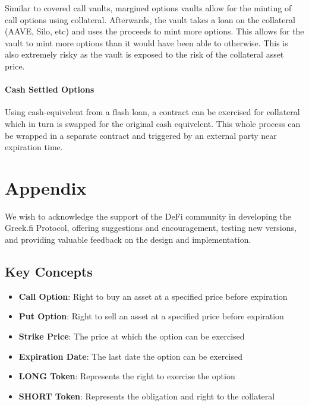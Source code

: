 \documentclass[%
 reprint,
 amsmath,amssymb,
 aps,
]{revtex4-2}
\begin{document}
Similar to covered call vaults, margined options vaults allow for the
minting of call options using collateral. Afterwards, the vault takes a
loan on the collateral (AAVE, Silo, etc) and uses the proceeds to mint
more options. This allows for the vault to mint more options than it
would have been able to otherwise. This is also extremely risky as the 
vault is exposed to the risk of the collateral asset price.

\paragraph*{Cash Settled Options} 

Using cash-equivelent from a flash loan, 
a contract can be exercised for collateral which 
in turn is swapped for the original cash equivelent.
This whole process can be wrapped in a separate contract
and triggered by an external party near expiration time.

\section{\label{sec:appendix}Appendix}


\begin{acknowledgments}
We wish to acknowledge the support of the DeFi community in developing
the Greek.fi Protocol, offering suggestions and encouragement, testing new versions,
and providing valuable feedback on the design and implementation.
\end{acknowledgments}

\appendix

\subsection{Key Concepts}

\begin{itemize}
\item
  \textbf{Call Option}: Right to buy an asset at a specified price
  before expiration
\item
  \textbf{Put Option}: Right to sell an asset at a specified price
  before expiration
\item
  \textbf{Strike Price}: The price at which the option can be exercised
\item
  \textbf{Expiration Date}: The last date the option can be exercised
\item
  \textbf{LONG Token}: Represents the right to exercise the option
\item
  \textbf{SHORT Token}: Represents the obligation and right to the
  collateral
\end{itemize}
\end{document}
